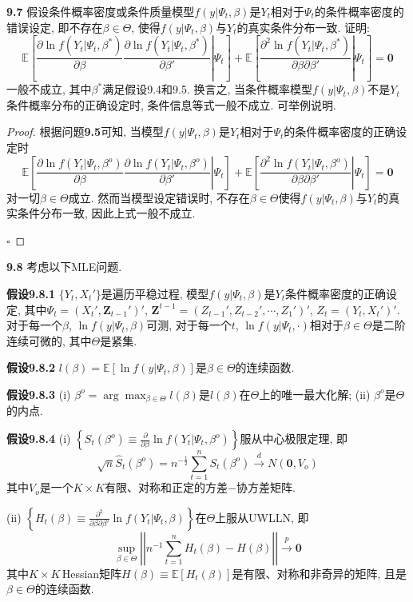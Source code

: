 \documentclass[cn,12pt,math=mtpro2,citestyle=gb7714-2015,bibstyle=gb7714-2015,twocol,mode=simple]{elegantbook}
\newcommand{\E}{\mathbb{E}}
\begin{document}
\textbf{9.7} 假设条件概率密度或条件质量模型$f(y|\Psi_t,\beta)$是$Y_t$相对于$\Psi_t$的条件概率密度的错误设定, 即不存在$\beta\in\Theta$, 使得$f(y|\Psi_t,\beta)$与$Y_t$的真实条件分布一致. 证明:
$$\E\left[\left.\frac{\partial \ln f(Y_t|\Psi_t,\beta^\ast)}{\partial\beta}\frac{\partial \ln f(Y_t|\Psi_t,\beta^\ast)}{\partial\beta'}\right|\Psi_t\right]+\E\left[\left.\frac{\partial^2\ln f(Y_t|\Psi_t,\beta^\ast)}{\partial\beta\partial\beta'}\right|\Psi_t\right]=\mathbf{0}$$
一般不成立, 其中$\beta^\ast$满足假设9.4和9.5. 换言之, 当条件概率模型$f(y|\Psi_t,\beta)$不是$Y_t$条件概率分布的正确设定时, 条件信息等式一般不成立. 可举例说明.
\begin{proof}
  根据问题\textbf{9.5}可知, 当模型$f(y|\Psi_t,\beta)$是$Y_t$相对于$\Psi_t$的条件概率密度的正确设定时
  $$\E\left[\left.\frac{\partial \ln f(Y_t|\Psi_t,\beta^o)}{\partial\beta}\frac{\partial \ln f(Y_t|\Psi_t,\beta^o)}{\partial\beta'}\right|\Psi_t\right]+\E\left[\left.\frac{\partial^2\ln f(Y_t|\Psi_t,\beta^o)}{\partial\beta\partial\beta'}\right|\Psi_t\right]=\mathbf{0}$$
  对一切$\beta\in\Theta$成立. 然而当模型设定错误时, 不存在$\beta\in\Theta$使得$f(y|\Psi_t,\beta)$与$Y_t$的真实条件分布一致, 因此上式一般不成立.

  $\square$
\end{proof}

\textbf{9.8} 考虑以下MLE问题.

\textbf{假设9.8.1} $\{Y_t,X_t'\}$是遍历平稳过程, 模型$f(y|\Psi_t,\beta)$是$Y_t$条件概率密度的正确设定, 其中$\Psi_t=(X_t',\mathbf{Z}_{t-1}')'$, $\mathbf{Z}^{t-1}=(Z_{t-1}',Z_{t-2}',\cdots,Z_1')'$, $Z_t=(Y_t,X_t')'$. 对于每一个$\beta$, $\ln f(y|\Psi_t,\beta)$可测, 对于每一个$t$, $\ln f(y|\Psi_t,\cdot)$相对于$\beta\in\Theta$是二阶连续可微的, 其中$\Theta$是紧集.

\textbf{假设9.8.2} $l(\beta)=\E[\ln f(y|\Psi_t,\beta)]$是$\beta\in\Theta$的连续函数.

\textbf{假设9.8.3} (i) $\displaystyle\beta^o=\arg\max_{\beta\in\Theta}l(\beta)$是$l(\beta)$在$\Theta$上的唯一最大化解; (ii) $\beta^o$是$\Theta$的内点.

\textbf{假设9.8.4} (i) $\displaystyle\left\{S_t(\beta^o)\equiv\frac{\partial}{\partial\beta}\ln f(Y_t|\Psi_t,\beta^o)\right\}$服从中心极限定理, 即
$$\sqrt{n}\hat{S}_t(\beta^o)=n^{-\frac{1}{2}}\sum_{t=1}^{n}S_t(\beta^o)\xrightarrow{d}N(\mathbf{0},V_o)$$
其中$V_o$是一个$K\times K$有限、对称和正定的方差$-$协方差矩阵.

(ii) $\displaystyle\left\{H_t(\beta)\equiv\frac{\partial^2}{\partial\beta\partial\beta'}\ln f(Y_t|\Psi_t,\beta)\right\}$在$\Theta$上服从UWLLN, 即
$$\sup_{\beta\in\Theta}\left|\left|n^{-1}\sum_{t=1}^{n}H_t(\beta)-H(\beta)\right|\right|\xrightarrow{p}\mathbf{0}$$
其中$K\times K\,$Hessian矩阵$H(\beta)\equiv\E[H_t(\beta)]$是有限、对称和非奇异的矩阵, 且是$\beta\in\Theta$的连续函数.
\end{document}
